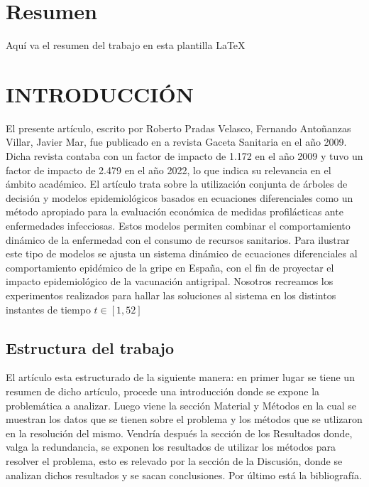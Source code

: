 \documentclass{wscpaperproc}
\theoremstyle{wsc}
\begin{document}
  

\maketitle
\newpage

\section*{Resumen}
Aqu\'i va el resumen del trabajo en esta plantilla  \LaTeX\ 

\section{INTRODUCCI\'ON}
El presente art\'iculo, escrito por Roberto Pradas Velasco, Fernando Antoñanzas Villar, Javier Mar, fue publicado en a revista Gaceta Sanitaria en el año 2009. 
Dicha revista  contaba con un factor de impacto de 1.172 en el a\~no 2009 y tuvo un factor de impacto de 2.479 en el a\~no 2022, lo que indica su 
relevancia en el \'ambito acad\'emico.
El art\'iculo trata sobre la utilizaci\'on conjunta de \'arboles de decisi\'on y modelos epidemiol\'ogicos basados en ecuaciones
diferenciales como un m\'etodo apropiado para la evaluaci\'on econ\'omica de medidas profil\'acticas ante
enfermedades infecciosas. Estos modelos permiten combinar el comportamiento din\'amico de la
enfermedad con el consumo de recursos sanitarios. Para ilustrar este tipo de modelos se ajusta un sistema
din\'amico de ecuaciones diferenciales al comportamiento epid\'emico de la gripe en España, con el fin de
proyectar el impacto epidemiol\'ogico de la vacunaci\'on antigripal. Nosotros recreamos los experimentos realizados para hallar las soluciones 
al sistema en los distintos instantes de tiempo $t \in [1,52] $
\label{sec:intro}

\subsection{Estructura del trabajo}
El art\'iculo esta estructurado de la siguiente manera: en primer lugar se tiene un resumen de dicho art\'iculo, procede una introducci\'on donde se expone la problem\'atica 
a analizar. Luego viene la secci\'on Material y M\'etodos en la cual se muestran los datos que se tienen sobre el problema y los m\'etodos que se utlizaron en la resoluci\'on 
del mismo. Vendr\'ia despu\'es la secci\'on de los Resultados donde, valga la redundancia, se exponen los resultados de utilizar los m\'etodos para resolver el problema, esto 
es relevado por la secci\'on de la Discusi\'on, donde se analizan dichos resultados y se sacan conclusiones. Por \'ultimo est\'a la bibliograf\'ia.
\end{document}
